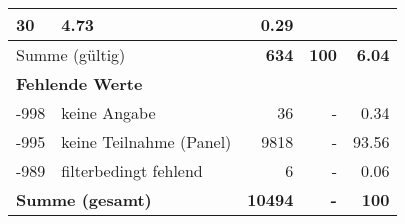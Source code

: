 \begin{longtable}{lXrrr}
       \num{30} &
       \num[round-mode=places,round-precision=2]{4,73} &
         \num[round-mode=places,round-precision=2]{0,29} \\
     \midrule
     \multicolumn{2}{l}{Summe (gültig)} &
       \textbf{\num{634}} &
     \textbf{100} &
       \textbf{\num[round-mode=places,round-precision=2]{6,04}} \\
     \multicolumn{5}{l}{\textbf{Fehlende Werte}}\\
       -998 &
       keine Angabe &
         \num{36} &
        - &
         \num[round-mode=places,round-precision=2]{0,34} \\
       -995 &
       keine Teilnahme (Panel) &
         \num{9818} &
        - &
         \num[round-mode=places,round-precision=2]{93,56} \\
       -989 &
       filterbedingt fehlend &
         \num{6} &
        - &
         \num[round-mode=places,round-precision=2]{0,06} \\
     \midrule
     \multicolumn{2}{l}{\textbf{Summe (gesamt)}} &
          \textbf{\num{10494}} &
        \textbf{-} &
        \textbf{100} \\
     \bottomrule
     \end{longtable}
     
